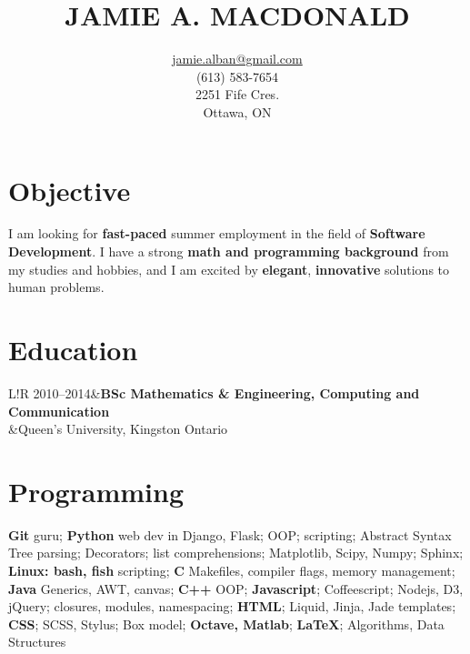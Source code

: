 \documentclass[10pt]{article}
\title{JAMIE A. MACDONALD}
\author{\href{mailto:jamie.alban@gmail.com}{jamie.alban@gmail.com}\\(613) 583-7654\\2251 Fife Cres.\\Ottawa, ON}
\date{}
\newcommand\VRule{\color{lightgray}\vrule width 0.5pt}
\begin{document}
\begin{minipage}{0.2\textwidth}
\hspace{0em}
\end{minipage}
\begin{minipage}{0.55\textwidth}
\vspace{-3em}
\maketitle
\end{minipage}
\begin{minipage}{0.25\textwidth}
\end{minipage}
\thispagestyle{fancy}
\vspace{-3em}
\section*{Objective}
I am looking for \textbf{fast-paced} summer employment in the field of \textbf{Software Development}. I have a strong \textbf{math and programming background} from my studies and hobbies, and I am excited by \textbf{elegant}, \textbf{innovative} solutions to human problems.
\vspace{-1em}
\section*{Education}
\begin{tabular}{L!{\VRule}R}
2010--2014&{\bf BSc Mathematics \& Engineering, Computing and Communication}\\
          &{Queen's University, Kingston Ontario}\\
\end{tabular}
\vspace{-1em}
\section*{Programming}
\textbf{Git} guru; \textbf{Python} web dev in Django, Flask; OOP; scripting; Abstract Syntax Tree parsing; Decorators; list comprehensions; Matplotlib, Scipy, Numpy; Sphinx; \textbf{Linux: bash, fish} scripting; \textbf{C} Makefiles, compiler flags, memory management; \textbf{Java} Generics, AWT, canvas; \textbf{C++} OOP; \textbf{Javascript}; Coffeescript; Nodejs, D3, jQuery; closures, modules, namespacing; \textbf{HTML}; Liquid, Jinja, Jade templates; \textbf{CSS}; SCSS, Stylus; Box model; \textbf{Octave, Matlab}; \textbf{LaTeX}; Algorithms, Data Structures
\end{document}
